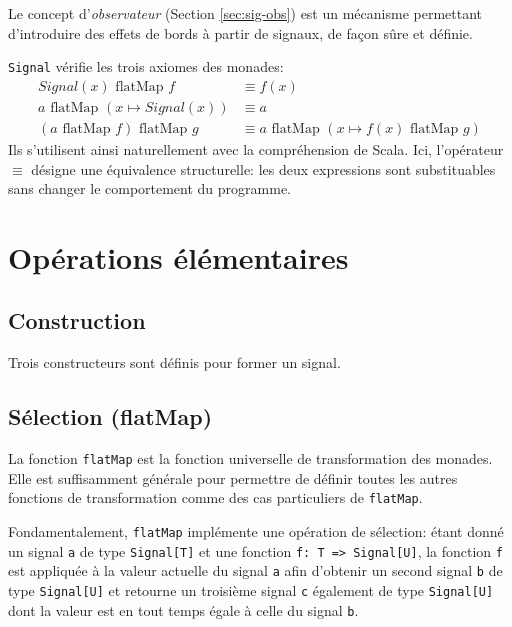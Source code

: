 	Le concept d'\emph{observateur} (Section \ref{sec:sig-obs}) est un mécanisme permettant d'introduire des effets de bords à partir de signaux, de façon sûre et définie.
	
	\texttt{Signal} vérifie les trois axiomes des monades\cite{haskell-monad-laws}:
	\begin{align*}
		Signal(x) \text{ flatMap } f &\equiv f(x) \\
		a \text{ flatMap } (x \mapsto Signal(x)) &\equiv a \\
		(a \text{ flatMap } f)  \text{ flatMap } g &\equiv
			a \text{ flatMap } (x \mapsto f(x)  \text{ flatMap } g) 
	\end{align*}
	Ils s'utilisent ainsi naturellement avec la compréhension  de Scala. Ici, l'opérateur $\equiv$ désigne une équivalence structurelle: les deux expressions sont substituables sans changer le comportement du programme.

\section{Opérations élémentaires}
	
	\subsection{Construction}
	
		Trois constructeurs sont définis pour former un signal.
	
		\begin{center}
		\end{center}

	\subsection{Sélection (flatMap)}
	
		La fonction \texttt{flatMap} est la fonction universelle de transformation des monades. Elle est suffisamment générale pour permettre de définir toutes les autres fonctions de transformation comme des cas particuliers de \texttt{flatMap}.
	
		\begin{center}
		\end{center}
		
		Fondamentalement, \texttt{flatMap} implémente une opération de sélection: étant donné un signal \texttt{a} de type \texttt{Signal[T]} et une fonction \texttt{f: T => Signal[U]}, la fonction \texttt{f} est appliquée à la valeur actuelle du signal \texttt{a} afin d'obtenir un second signal \texttt{b} de type \texttt{Signal[U]} et retourne un troisième signal \texttt{c} également de type \texttt{Signal[U]} dont la valeur est en tout temps égale à celle du signal \texttt{b}.
		
